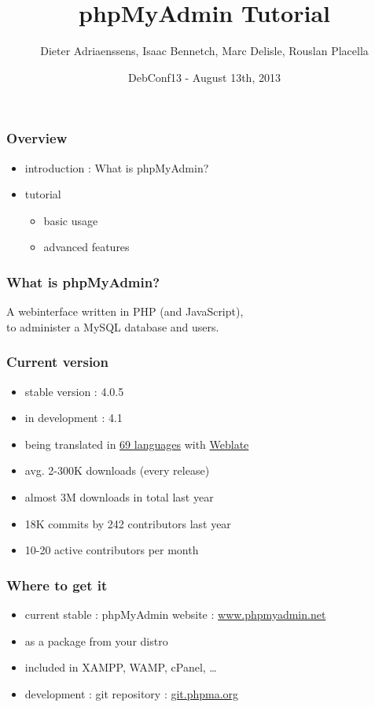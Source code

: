 \documentclass[14pt]{beamer}
\title{phpMyAdmin Tutorial}
\author[]{Dieter Adriaenssens, Isaac Bennetch, Marc Delisle, Rouslan Placella}
\institute[phpMyAdmin team]{phpMyAdmin team members}
\date[DebConf13 - 13Aug2013]{DebConf13 - August 13th, 2013}
\begin{document}
  \begin{frame}
  \titlepage
  \end{frame}
  \begin{frame}
    \frametitle{Overview}
    \begin{itemize}
      \item introduction : What is phpMyAdmin?
      \item tutorial
      \begin{itemize}
        \item basic usage
        \item advanced features
      \end{itemize}
    \end{itemize}
  \end{frame}
  \begin{frame}
    \frametitle{What is phpMyAdmin?}
      A webinterface written in PHP (and JavaScript),\\
      to administer a MySQL database and users.
  \end{frame}
  \begin{frame}
    \frametitle{Current version}
    \begin{itemize}
      \item stable version : 4.0.5
      \item in development : 4.1
      \item being translated in \href{http://www.phpmyadmin.net/home\_page/translations.php}{69 languages} with \href{http://www.weblate.org/}{Weblate}
      \item avg. 2-300K downloads (every release)
      \item almost 3M downloads in total last year
      \item 18K commits by 242 contributors last year
      \item 10-20 active contributors per month
    \end{itemize}
  \end{frame}
  \begin{frame}
    \frametitle{Where to get it}
    \begin{itemize}
      \item current stable : phpMyAdmin website : \href{http://www.phpmyadmin.net/}{www.phpmyadmin.net}
      \item as a package from your distro
      \item included in XAMPP, WAMP, cPanel, \ldots
      \item development : git repository :  \href{http://git.phpma.org/}{git.phpma.org}
    \end{itemize}
  \end{frame}
\end{document}
